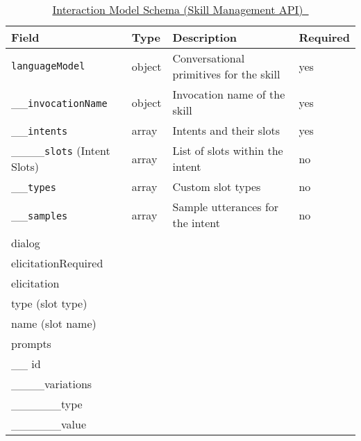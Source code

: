 \begin{table}[h]
	\caption[Interaction Model Schema]{\href{https://developer.amazon.com/docs/smapi/interaction-model-schema.html}{Interaction Model Schema (Skill Management API)~\cite{alexaDesignGuide} }}\label{interactionModel}
	\begin{tabularx}{\textwidth}{|l | l l l | }
		Field	&	Type	&	Description		&	Required \\ \hline
		\lstinline|languageModel| &	object	& Conversational primitives for the skill	& yes\\
		\_\_\lstinline|invocationName| &	object	& Invocation name of the skill	& yes\\
		\_\_\lstinline|intents| &	array	& Intents and their slots	& yes\\
		\_\_\_\_\lstinline|slots| (Intent Slots) & array & List of slots within the intent	& no\\
		\_\_\lstinline|types| &	array	& Custom slot types		& no\\
		\_\_\lstinline|samples|	& array	 & Sample utterances for the intent	& no\\
		
		dialog & & & \\
		elicitationRequired & & & \\
		elicitation & & & \\
		type (slot type) & & & \\
		name (slot name) & & & \\
		
		prompts & & & \\
		\_\_ id  & & & \\
		\_\_\_\_variations  & & & \\
		\_\_\_\_\_\_type  & & & \\
		\_\_\_\_\_\_value  & & & \\ \hline
		
	\end{tabularx}			
\end{table}






























